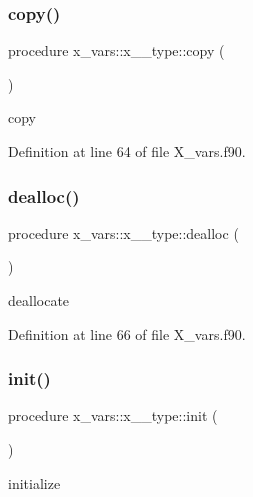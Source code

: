 \subsubsection{\texorpdfstring{copy()}{copy()}}
{\footnotesize\ttfamily procedure x\+\_\+vars\+::x\+\_\+\_\+type\+::copy (\begin{DoxyParamCaption}{ }\end{DoxyParamCaption})}



copy 



Definition at line 64 of file X\+\_\+vars.\+f90.

\mbox{\label{structx__vars_1_1x__1__type_aee743fbc89e8e5486495ae3f6c49bd09}} 
\subsubsection{\texorpdfstring{dealloc()}{dealloc()}}
{\footnotesize\ttfamily procedure x\+\_\+vars\+::x\+\_\+\_\+type\+::dealloc (\begin{DoxyParamCaption}{ }\end{DoxyParamCaption})}



deallocate 



Definition at line 66 of file X\+\_\+vars.\+f90.

\mbox{\label{structx__vars_1_1x__1__type_a519c9ca8ceb73fb7010a587fab3248f8}} 
\subsubsection{\texorpdfstring{init()}{init()}}
{\footnotesize\ttfamily procedure x\+\_\+vars\+::x\+\_\+\_\+type\+::init (\begin{DoxyParamCaption}{ }\end{DoxyParamCaption})}



initialize 



